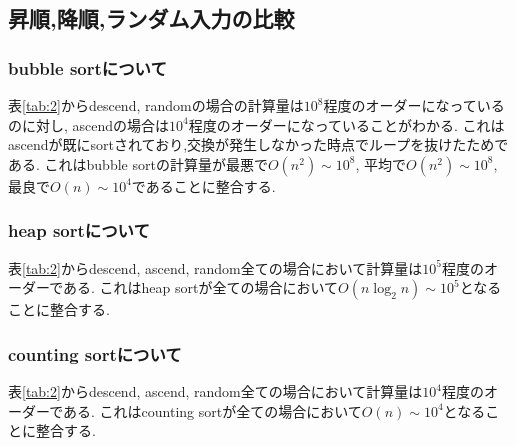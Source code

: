 \documentclass[uplatex,a4j,11pt,dvipdfmx]{jsarticle}
\begin{document}
\subsection{昇順,降順,ランダム入力の比較}
\subsubsection{bubble sortについて}
表\ref{tab:2}からdescend, randomの場合の計算量は$10^8$程度のオーダーになっているのに対し,
ascendの場合は$10^4$程度のオーダーになっていることがわかる.
これはascendが既にsortされており,交換が発生しなかった時点でループを抜けたためである.
これはbubble sortの計算量が最悪で$O(n^2)\sim10^8$, 平均で$O(n^2)\sim10^8$, 最良で$O(n)\sim10^4$であることに整合する.
\subsubsection{heap sortについて}
表\ref{tab:2}からdescend, ascend, random全ての場合において計算量は$10^5$程度のオーダーである.
これはheap sortが全ての場合において$O(n\log_2n)\sim10^5$となることに整合する.
\subsubsection{counting sortについて}
表\ref{tab:2}からdescend, ascend, random全ての場合において計算量は$10^4$程度のオーダーである.
これはcounting sortが全ての場合において$O(n)\sim10^4$となることに整合する.
\end{document}
